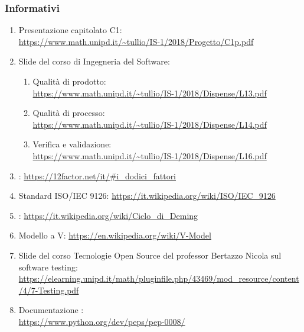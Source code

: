     \subsubsection{Informativi}\label{riferimenti informativi}
    \begin{enumerate}
    	\item Presentazione capitolato C1:\\ \url{https://www.math.unipd.it/~tullio/IS-1/2018/Progetto/C1p.pdf}
    	\item Slide del corso di Ingegneria del Software:
    	\begin{enumerate}
    		\item Qualità di prodotto:\\ \url{https://www.math.unipd.it/~tullio/IS-1/2018/Dispense/L13.pdf}
    		\item Qualità di processo:\\ \url{https://www.math.unipd.it/~tullio/IS-1/2018/Dispense/L14.pdf}
    		\item Verifica e validazione:\\
    		\url{https://www.math.unipd.it/~tullio/IS-1/2018/Dispense/L16.pdf}
    	\end{enumerate}
    	\item {}:
    	\url{https://12factor.net/it/#i_dodici_fattori}
    	\item Standard ISO/IEC 9126:
    	\url{https://it.wikipedia.org/wiki/ISO/IEC_9126}
    	\item {}:
    	\url{https://it.wikipedia.org/wiki/Ciclo_di_Deming}
    	\item Modello a V:
    	\url{https://en.wikipedia.org/wiki/V-Model}
    	\item Slide del corso Tecnologie Open Source del professor Bertazzo Nicola sul software testing:\\
		\url{https://elearning.unipd.it/math/pluginfile.php/43469/mod_resource/content/4/7-Testing.pdf}
		\item Documentazione :\\
        \url{https://www.python.org/dev/peps/pep-0008/}
    \end{enumerate}
